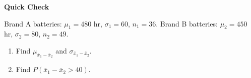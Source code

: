 \documentclass[10pt]{article}
\begin{document}
\begin{practicebox}
\textbf{Quick Check}

Brand A batteries: $\mu_1 = 480$ hr, $\sigma_1 = 60$, $n_1 = 36$.
Brand B batteries: $\mu_2 = 450$ hr, $\sigma_2 = 80$, $n_2 = 49$.

\begin{enumerate}
  \item Find $\mu_{\bar{x}_1-\bar{x}_2}$ and $\sigma_{\bar{x}_1-\bar{x}_2}$.
        \vspace{0.6in}
  \item Find $P(\bar{x}_1 - \bar{x}_2 > 40)$.
        \vspace{0.8in}
\end{enumerate}
\end{practicebox}
\end{document}

